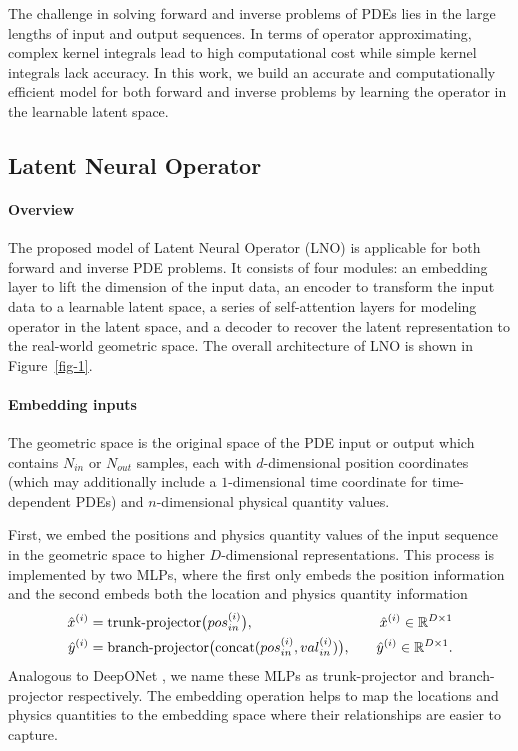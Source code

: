 \documentclass{article}
\begin{document}
The challenge in solving forward and inverse problems of PDEs lies in the large lengths of input and output sequences. In terms of operator approximating, complex kernel integrals lead to high computational cost while simple kernel integrals lack accuracy. In this work, we build an accurate and computationally efficient model for both forward and inverse problems by learning the operator in the learnable latent space.

\subsection{Latent Neural Operator}
\label{LNO}
\paragraph{Overview}  The proposed model of Latent Neural Operator (LNO) is applicable for both forward and inverse PDE problems. It consists of four modules: an embedding layer to lift the dimension of the input data, an encoder to transform the input data to a learnable latent space, a series of self-attention layers for modeling operator in the latent space, and a decoder to recover the latent representation to the real-world geometric space. The overall architecture of LNO is shown in Figure~\ref{fig-1}.

\paragraph{Embedding inputs}
The geometric space is the original space of the PDE input or output which contains $N_{in}$ or $N_{out}$ samples, each with $d$-dimensional position coordinates (which may additionally include a $1$-dimensional time coordinate for time-dependent PDEs) and $n$-dimensional physical quantity values. 

First, we embed the positions and physics quantity values of the input sequence in the geometric space to higher $D$-dimensional representations. This process is implemented by two MLPs, where the first only embeds the position information and the second embeds both the location and physics quantity information
\begin{equation}\label{eq:embed}
    \begin{aligned} 
    {\hat{x}}^{(i)} &= {\rm trunk\text{-}projector}
    \big({pos}_{in}^{(i)}
    \big), 
    &{\hat{x}}^{(i)}\in \mathbb{R}^{D \times 1} \nonumber
    \\
    {\hat{y}}^{(i)} &= {\rm branch\text{-}projector}
    \big({\rm concat}({pos}_{in}^{(i)},
    {val}_{in}^{(i)})
    \big), \quad&{\hat{y}}^{(i)}\in \mathbb{R}^{D \times 1}. \nonumber
    \end{aligned}
\end{equation}
Analogous to DeepONet \cite{DeepONet}, we name these MLPs as trunk-projector and branch-projector respectively. The embedding operation helps to map the locations and physics quantities to the embedding space where their relationships are easier to capture.
\end{document}
